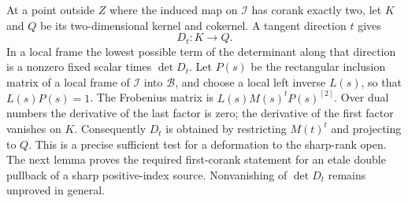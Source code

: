\begin{remark}
\label{rem:DE-A3-positive-index-variation-candidate}
At a point outside $Z$ where the induced map on $\mathcal I$
has corank exactly two, let $K$ and $Q$ be its two-dimensional
kernel and cokernel. A tangent direction $t$ gives
\[
 D_t:K\longrightarrow Q.
\]
In a local frame the lowest possible term of the determinant
along that direction is a nonzero fixed scalar times
$\det D_t$. Let $P(s)$ be the rectangular inclusion matrix of a
local frame of $\mathcal I$ into $\mathcal B$, and choose a local
left inverse $L(s)$, so that $L(s)P(s)=1$.
The Frobenius matrix is $L(s)M(s)^tP(s)^{[2]}$. Over dual numbers the
derivative of the last factor is zero; the derivative of the
first factor vanishes on $K$. Consequently $D_t$ is obtained
by restricting $M(t)^t$ and projecting to $Q$.
This is a precise sufficient test for a deformation to the
sharp-rank open. The next lemma proves the required first-corank
statement for an etale double pullback of a sharp positive-index
source. Nonvanishing of $\det D_t$ remains unproved in general.
\end{remark}

